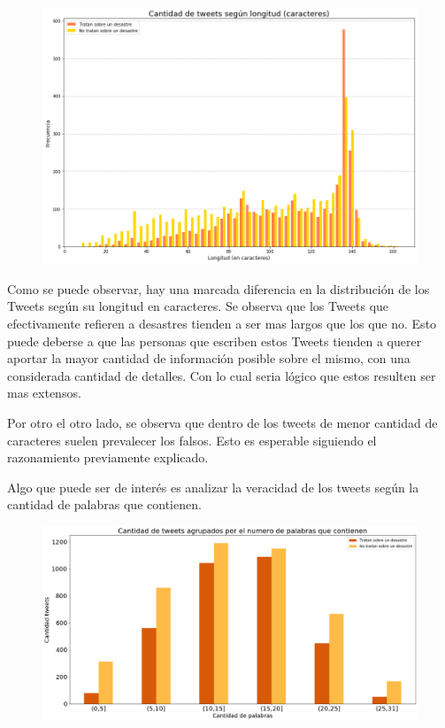\documentclass[titlepage,a4paper]{article}
\begin{document}
    \begin{figure}[H]
    \centering
    \includegraphics[width=1\textwidth]{graficos/Analisis Lexico Grafico/cantidad_de_tweets_segun_longitud_en_caracteres.png}
    \caption{}
    \end{figure}
    
    Como se puede observar, hay una marcada diferencia en la distribución de los Tweets según su longitud en caracteres. Se observa que los Tweets que efectivamente refieren a desastres tienden a ser mas largos que los que no. Esto puede deberse a que las personas que escriben estos Tweets tienden a querer aportar la mayor cantidad de información posible sobre el mismo, con una considerada cantidad de detalles. Con lo cual seria lógico que estos resulten ser mas extensos.
    
    Por otro el otro lado, se observa que dentro de los tweets de menor cantidad de caracteres suelen prevalecer los falsos. Esto es esperable siguiendo el razonamiento previamente explicado.
    
    
    Algo que puede ser de interés es analizar la veracidad de los tweets según la cantidad de palabras que contienen.
    
    \begin{figure}[H]
    \centering
    \includegraphics[width=1\textwidth]{graficos/Analisis Lexico Grafico/cantidad_de_tweets_agrupados_por_numero_de_palabras.png}
    \caption{}
    \end{figure}
    
\end{document}
